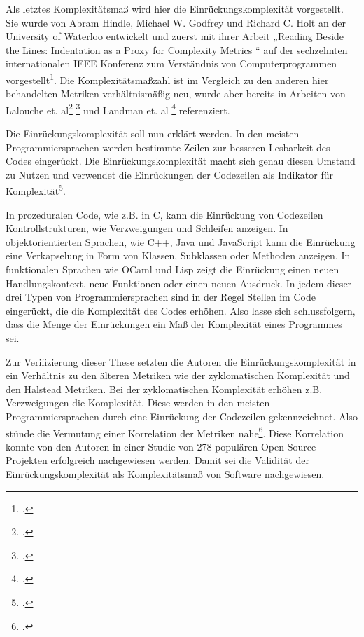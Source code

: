 Als letztes Komplexitätsmaß wird hier die Einrückungskomplexität
vorgestellt. Sie wurde von Abram Hindle, Michael W. Godfrey und Richard
C. Holt an der University of Waterloo entwickelt und zuerst mit ihrer
Arbeit „Reading Beside the Lines: Indentation as a Proxy for Complexity
Metrics `` auf der sechzehnten internationalen IEEE Konferenz zum
Verständnis von Computerprogrammen vorgestellt\footcite[Vgl. ][S. 1]{hindleReadingLinesIndentation2008}. Die Komplexitätsmaßzahl ist im Vergleich zu den anderen hier
behandelten Metriken verhältnismäßig neu, wurde aber bereits in Arbeiten
von Lalouche et. al\footcite[Vgl. ][S. 10]{gilWhenSoftwareComplexity2016}
\footcite[Vgl. ][S. 7]{gilCorrelationSizeMetric2017} und Landman et. al
\footcite[Vgl. ][S. 6]{landmanEmpiricalAnalysisRelationship2016} referenziert.

Die Einrückungskomplexität soll nun erklärt werden. In den meisten
Programmiersprachen werden bestimmte Zeilen zur besseren Lesbarkeit des
Codes eingerückt. Die Einrückungskomplexität macht sich genau diesen
Umstand zu Nutzen und verwendet die Einrückungen der Codezeilen als
Indikator für Komplexität\footcite[Vgl. ][S. 1]{hindleReadingLinesUsing2009}.

In prozeduralen Code, wie z.B. in C, kann die Einrückung von Codezeilen
Kontrollstrukturen, wie Verzweigungen und Schleifen anzeigen. In
objektorientierten Sprachen, wie C++, Java und JavaScript kann die
Einrückung eine Verkapselung in Form von Klassen, Subklassen oder
Methoden anzeigen. In funktionalen Sprachen wie OCaml und Lisp zeigt die
Einrückung einen neuen Handlungskontext, neue Funktionen oder einen
neuen Ausdruck. In jedem dieser drei Typen von
Programmiersprachen sind in der Regel Stellen im Code eingerückt, die
die Komplexität des Codes erhöhen. Also lasse sich schlussfolgern, dass
die Menge der Einrückungen ein Maß der Komplexität eines Programmes sei.

Zur Verifizierung dieser These setzten die Autoren die
Einrückungskomplexität in ein Verhältnis zu den älteren Metriken wie der
zyklomatischen Komplexität und den Halstead Metriken. Bei der
zyklomatischen Komplexität erhöhen z.B. Verzweigungen die Komplexität.
Diese werden in den meisten Programmiersprachen durch eine Einrückung
der Codezeilen gekennzeichnet. Also stünde die Vermutung einer
Korrelation der Metriken nahe\footcite[Vgl. ][S. 2]{hindleReadingLinesUsing2009}.
Diese Korrelation konnte von den Autoren in einer Studie von 278
populären Open Source Projekten erfolgreich nachgewiesen
werden. Damit sei die Validität der
Einrückungskomplexität als Komplexitätsmaß von Software nachgewiesen.

